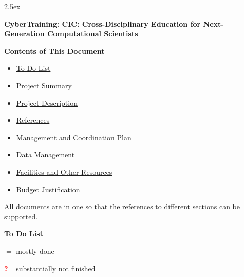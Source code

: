 \documentclass[11pt]{NSFamsart}
\newcommand{\notyet}{\textcolor{red}{\textbf{?}}}
\newcommand{\done}{\textcolor{green}{\checkmark}}
\begin{document}
\leftmargini2.5ex %
\begin{center}
{\LARGE \textbf{CyberTraining: CIC:  Cross-Disciplinary Education for Next-Generation Computational Scientists}}
\end{center}

\vspace{5ex}

\centerline{\Large \textbf{Contents of This Document}}
\bigskip
\begin{itemize}
\item \hyperlink{ToDo}{To Do List}
\item \hyperlink{ProjSumm}{Project Summary}
\item \hyperlink{ProjDesc}{Project Description}
\item \hyperlink{Refer}{References}
\item \hyperlink{Manage}{Management and Coordination Plan}
\item \hyperlink{DataManage}{Data Management}
\item \hyperlink{Facilities}{Facilities and Other Resources}
\item \hyperlink{BudgetJust}{Budget Justification}
\end{itemize}

All documents are in one so that the references to different sections can be supported.

\newpage \setcounter{page}{1} %

\centerline{\Large \textbf{To Do List}}\hypertarget{ToDo}{}
\bigskip

\noindent \done $=$ mostly done

\noindent \notyet = substantially not finished
\end{document}
